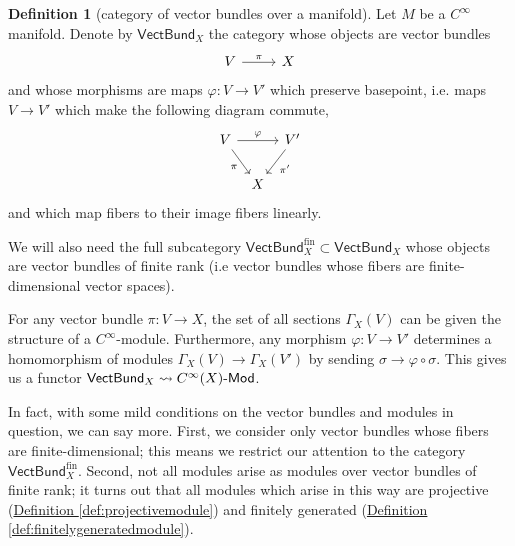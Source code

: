 \documentclass[a4paper,10pt]{scrreprt}
\def\mhyp{{\hbox{-}}}
\theoremstyle{definition}
\newtheorem{definition}{Definition}[section]
\theoremstyle{plain}
\theoremstyle{remark}
\begin{document}
\begin{definition}[category of vector bundles over a manifold]
  \label{def:categoryofvectorbundlesoveramanifold}
  Let $M$ be a $C^{\infty}$ manifold. Denote by $\mathsf{VectBund}_{X}$ the category whose objects are vector bundles 
  \begin{equation*}
    \begin{tikzcd}
      V 
      \arrow[r, "\pi"]
      & X
    \end{tikzcd}
  \end{equation*}
  and whose morphisms are maps $\varphi\colon V \to V'$ which preserve basepoint, i.e. maps $V \to V'$ which make the following diagram commute,
  \begin{equation*}
    \begin{tikzcd}[column sep=tiny]
      V
      \arrow[rr, "\varphi"]
      \arrow[rd, swap, "\pi"]
      & & V'
      \arrow[ld, "\pi'"]
      \\
      & X
    \end{tikzcd}
  \end{equation*}
  and which map fibers to their image fibers linearly.

  We will also need the full subcategory $\mathsf{VectBund}_{X}^{\text{fin}} \subset \mathsf{VectBund}_{X}$ whose objects are vector bundles of finite rank (i.e vector bundles whose fibers are finite-dimensional vector spaces).
\end{definition}

For any vector bundle $\pi\colon V \to X$, the set of all sections $\Gamma_{X}(V)$ can be given the structure of a $C^{\infty}$-module. Furthermore, any morphism $\varphi\colon V \to V'$ determines a homomorphism of modules $\Gamma_{X}(V) \to \Gamma_{X}(V')$ by sending $\sigma \to \varphi \circ \sigma$. This gives us a functor $\mathsf{VectBund}_{X} \rightsquigarrow C^{\infty}(X)\mhyp\mathsf{Mod}$.

In fact, with some mild conditions on the vector bundles and modules in question, we can say more. First, we consider only vector bundles whose fibers are finite-dimensional; this means we restrict our attention to the category $\mathsf{VectBund}^{\mathrm{fin}}_{X}$. Second, not all modules arise as modules over vector bundles of finite rank; it turns out that all modules which arise in this way are projective (\hyperref[def:projectivemodule]{Definition \ref*{def:projectivemodule}}) and finitely generated (\hyperref[def:finitelygeneratedmodule]{Definition \ref*{def:finitelygeneratedmodule}}).
\end{document}
